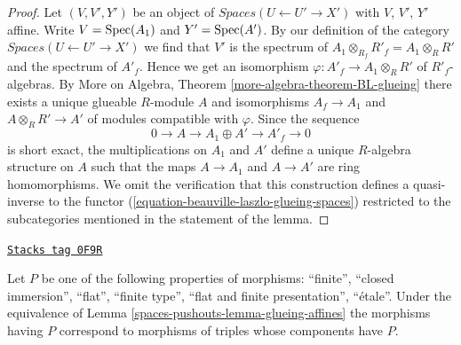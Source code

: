 \begin{proof}
Let $(V, V', Y')$ be an object of
$\textit{Spaces}(U \leftarrow U' \to X')$
with $V$, $V'$, $Y'$ affine.
Write $V = \operatorname{Spec}(A_1)$ and $Y' = \operatorname{Spec}(A')$. By our definition of the
category $\textit{Spaces}(U \leftarrow U' \to X')$ we find that
$V'$ is the spectrum of $A_1 \otimes_{R_f} R'_f = A_1 \otimes_R R'$
and the spectrum of $A'_f$. Hence we get an isomorphism
$\varphi : A'_f \to A_1 \otimes_R R'$ of $R'_f$-algebras.
By More on Algebra, Theorem \ref{more-algebra-theorem-BL-glueing}
there exists a unique glueable $R$-module $A$ and isomorphisms
$A_f \to A_1$ and $A \otimes_R R' \to A'$ of modules compatible with
$\varphi$. Since the sequence
$$
0 \to A \to A_1 \oplus A' \to A'_f \to 0
$$
is short exact, the multiplications on $A_1$ and $A'$ define
a unique $R$-algebra structure on $A$ such that the maps $A \to A_1$
and $A \to A'$ are ring homomorphisms. We omit the verification
that this construction defines a quasi-inverse to the functor
(\ref{equation-beauville-laszlo-glueing-spaces})
restricted to the subcategories mentioned in the statement of the lemma.
\end{proof}

\begin{lemma}
\label{spaces-pushouts-lemma-glueing-affines-etale}
\href{https://stacks.math.columbia.edu/tag/0F9R}{\texttt{Stacks tag 0F9R}}

Let $P$ be one of the following properties of morphisms:
``finite'', ``closed immersion'', ``flat'', ``finite type'',
``flat and finite presentation'', ``\'etale''.
Under the equivalence of Lemma \ref{spaces-pushouts-lemma-glueing-affines}
the morphisms having $P$ correspond to morphisms of triples
whose components have $P$.
\end{lemma}

